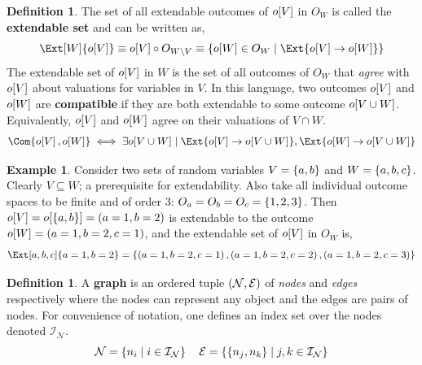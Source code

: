 \documentclass[aps, 10pt, english, twoside, pra, nofootinbib, longbibliography]{revtex4-1}
\theoremstyle{plain}
\theoremstyle{definition}
\newtheorem{definition}[theorem]{Definition}
\newtheorem{example}[theorem]{Example}
\theoremstyle{remark}
\newcommand{\nodes}{\mathcal{N}}
\newcommand{\edges}{\mathcal{E}}
\newcommand{\ind}{\mathcal{I}}
\newcommand{\valprod}{\circ}
\newcommand{\term}[1]{\textcolor{Mahogany}{\textbf{#1}}}
\newcommand{\outc}[1]{o\!\bs{#1}} %
\begin{document}
    \begin{definition}
        The set of all extendable outcomes of $\outc{V}$ in $O_{W}$ is called the \term{extendable set} and can be written as,
        \[ \Ext[W]{\outc{V}} \defined \outc{V} \valprod O_{W\setminus V} \defined \bc{\outc{W} \in O_{W} \mid \Ext{\outc{V} \to \outc{W}}} \]
        The extendable set of $\outc{V}$ in $W$ is the set of all outcomes of $O_W$ that \textit{agree} with $\outc{V}$ about valuations for variables in $V$. In this language, two outcomes $\outc{V}$ and $\outc{W}$ are \term{compatible} if they are both extendable to some outcome $\outc{V \cup W}$. Equivalently, $\outc{V}$ and $\outc{W}$ agree on their valuations of $V \cap W$.
        \[ \Com{\outc{V}, \outc{W}} \iff \exists \outc{V \cup W} \mid \Ext{\outc{V} \to \outc{V \cup W}}, \Ext{\outc{W} \to \outc{V \cup W}} \]
    \end{definition}

    \begin{example}
        Consider two sets of random variables $V = \left\{ a, b \right\}$ and $W = \left\{ a, b, c \right\}$. Clearly $V \subseteq W$; a prerequisite for extendability. Also take all individual outcome spaces to be finite and of order 3: $O_a = O_b = O_c = \left\{ 1,2,3 \right\}$. Then $\outc{V} = \outc{\bc{a,b}} = \br{a = 1, b = 2}$ is extendable to the outcome $\outc{W} = \br{a = 1, b = 2, c = 1}$, and the extendable set of $\outc{V}$ in $O_{W}$ is,
        \[ \Ext[a,b,c]{a = 1, b = 2} = \bc{\br{a = 1, b = 2, c = 1}, \br{a = 1, b = 2, c = 2}, \br{a = 1, b = 2, c = 3}} \]
    \end{example}


    \begin{definition}
        \label{def:graph}
        A \term{graph} is an ordered tuple $\br{\nodes, \edges}$ of \textit{nodes} and \textit{edges} respectively where the nodes can represent any object and the edges are pairs of nodes. For convenience of notation, one defines an index set over the nodes denoted $\ind_\nodes$.
        \[ \nodes = \bc{n_i \mid i \in \ind_\nodes} \quad \edges = \bc{\bc{n_j, n_k} \mid j,k \in \ind_\nodes} \]
    \end{definition}
\end{document}
